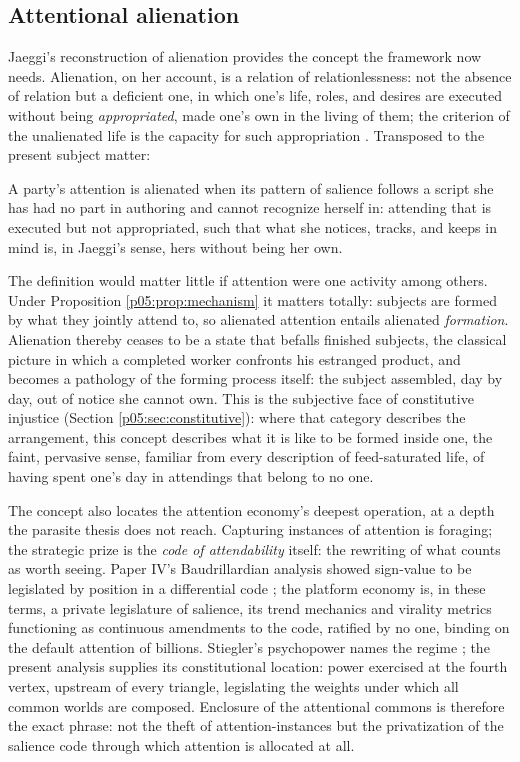\subsection{Attentional alienation}
\label{p05:sec:alienation}

Jaeggi's reconstruction of alienation provides the concept the framework now needs. Alienation, on her account, is a relation of relationlessness: not the absence of relation but a deficient one, in which one's life, roles, and desires are executed without being \emph{appropriated}, made one's own in the living of them; the criterion of the unalienated life is the capacity for such appropriation \parencite{jaeggi2014}. Transposed to the present subject matter:

\begin{defn}\label{p05:def:alienation}
A party's attention is alienated when its pattern of salience follows a script she has had no part in authoring and cannot recognize herself in: attending that is executed but not appropriated, such that what she notices, tracks, and keeps in mind is, in Jaeggi's sense, hers without being her own.
\end{defn}

The definition would matter little if attention were one activity among others. Under Proposition \ref{p05:prop:mechanism} it matters totally: subjects are formed by what they jointly attend to, so alienated attention entails alienated \emph{formation}. Alienation thereby ceases to be a state that befalls finished subjects, the classical picture in which a completed worker confronts his estranged product, and becomes a pathology of the forming process itself: the subject assembled, day by day, out of notice she cannot own. This is the subjective face of constitutive injustice (Section \ref{p05:sec:constitutive}): where that category describes the arrangement, this concept describes what it is like to be formed inside one, the faint, pervasive sense, familiar from every description of feed-saturated life, of having spent one's day in attendings that belong to no one.

The concept also locates the attention economy's deepest operation, at a depth the parasite thesis does not reach. Capturing instances of attention is foraging; the strategic prize is the \emph{code of attendability} itself: the rewriting of what counts as worth seeing. Paper IV's Baudrillardian analysis showed sign-value to be legislated by position in a differential code \parencite{baudrillard1981}; the platform economy is, in these terms, a private legislature of salience, its trend mechanics and virality metrics functioning as continuous amendments to the code, ratified by no one, binding on the default attention of billions. Stiegler's psychopower names the regime \parencite{stiegler2010}; the present analysis supplies its constitutional location: power exercised at the fourth vertex, upstream of every triangle, legislating the weights under which all common worlds are composed. Enclosure of the attentional commons is therefore the exact phrase: not the theft of attention-instances but the privatization of the salience code through which attention is allocated at all.

